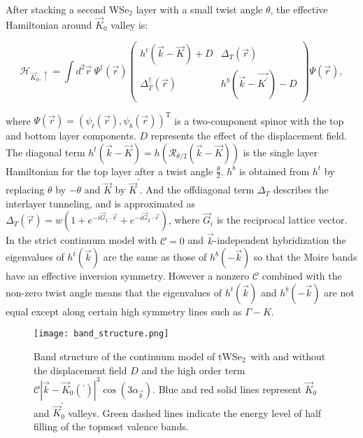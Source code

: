 \documentclass[%
reprint,
superscriptaddress,
twocolumn,
 amsmath,amssymb,
 aps,
 prb,
]{revtex4-2}
\newcommand{\twsetwo}{tWSe$_2$}
\begin{document}
After stacking a second WSe$_2$ layer with a small twist angle $\theta$, the effective Hamiltonian around $\vec{K}_0$ valley is:
\begin{widetext}
\begin{equation}
    \mathcal{H}_{\vec K_0 ,\uparrow}=\int d^2\vec{r}~\Psi^{\dagger}(\vec{r})\left(\begin{array}{cc}h^{t}(\vec{k}-\vec{K})+D & \Delta_{T}(\vec{r}) \\ \Delta_{T}^{\dagger}(\vec{r}) & h^{b}(\vec{k}-\vec{K^\prime})-D\end{array}\right)\Psi(\vec{r}),
\end{equation}
\end{widetext}
where $\Psi(\vec{r})=(\psi_t(\vec{r}),\psi_b(\vec{r}))^\text{T}$ is a two-component spinor with the top and bottom layer components. $D$ represents the effect of the displacement field. The diagonal term $h^{t}(\vec{k}-\vec{K})=h(\mathcal{R}_{\theta / 2} (\vec{k}-\vec{K}))$ is the single layer Hamiltonian for the top layer after a twist angle $\frac{\theta}{2}$. $h^b$ is obtained from $h^t$ by replacing $\theta$ by $-\theta$ and $\vec{K}$ by $\vec{K}^\prime$. And the offdiagonal term $\Delta_{T}$ describes the interlayer tunneling, and is approximated as $\Delta_{T}(\vec{r})=w\left(1+e^{-i \vec{G}_{1} \cdot \vec{r}}+e^{-i \vec{G}_{2} \cdot \vec{r}}\right)$, where $\vec{G}_i$ is the reciprocal lattice vector.  In the strict continuum model with $\mathcal{C}=0$ and $\vec{k}$-independent hybridization the eigenvalues of $h^t(\vec{k})$ are the same as those of $h^b(-\vec{k})$ so that the Moire bands have an effective inversion symmetry. However a nonzero $\mathcal{C}$ combined with the non-zero twist angle means that the eigenvalues of $h^t(\vec{k})$ and $h^b(-\vec{k})$ are not equal except along certain high symmetry lines such as $\Gamma-K$.


\begin{figure}[ht]
  \texttt{[image: band\_structure.png]}
  \caption{Band structure of the continuum model of \twsetwo~with and without the displacement field $D$ and the high order term  $\mathcal{C}|\vec{k}-\vec{K}_0(^\prime)|^{3} \cos (3 \alpha_{\vec{k}})$. Blue and red solid lines represent $\vec{K}_0$ and $\vec{K}^\prime_0$ valleys. Green dashed lines indicate the energy level of half filling of the topmost valence bands.}
  \label{fig:band_structure}
\end{figure}
\end{document}
